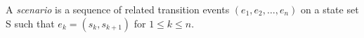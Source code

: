\documentclass[12pt]{article}
\begin{document}
A \emph{scenario} is a sequence of related transition events $(e_1, e_2, \ldots,  e_n)$ on a state set S such that $e_k = (s_k, s_{k + 1})$ for $1 \leq k \leq n$.
\end{document}
